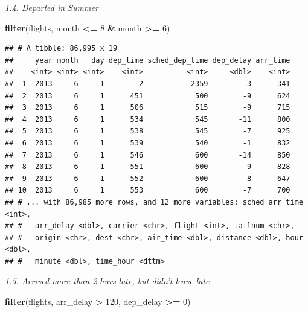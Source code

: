 \documentclass[]{book}
\newenvironment{Shaded}{\begin{snugshade}}{\end{snugshade}}
\newcommand{\DecValTok}[1]{\textcolor[rgb]{0.00,0.00,0.81}{#1}}
\newcommand{\KeywordTok}[1]{\textcolor[rgb]{0.13,0.29,0.53}{\textbf{#1}}}
\newcommand{\NormalTok}[1]{#1}
\newcommand{\OperatorTok}[1]{\textcolor[rgb]{0.81,0.36,0.00}{\textbf{#1}}}
\newcommand{\StringTok}[1]{\textcolor[rgb]{0.31,0.60,0.02}{#1}}
\theoremstyle{definition}
\theoremstyle{definition}
\theoremstyle{definition}
\theoremstyle{remark}
\begin{document}
\emph{1.4. Departed in Summer}

\begin{Shaded}
\begin{Highlighting}[]
\KeywordTok{filter}\NormalTok{(flights, month }\OperatorTok{<=}\StringTok{ }\DecValTok{8} \OperatorTok{&}\StringTok{ }\NormalTok{month }\OperatorTok{>=}\StringTok{ }\DecValTok{6}\NormalTok{)}
\end{Highlighting}
\end{Shaded}

\begin{verbatim}
## # A tibble: 86,995 x 19
##     year month   day dep_time sched_dep_time dep_delay arr_time
##    <int> <int> <int>    <int>          <int>     <dbl>    <int>
##  1  2013     6     1        2           2359         3      341
##  2  2013     6     1      451            500        -9      624
##  3  2013     6     1      506            515        -9      715
##  4  2013     6     1      534            545       -11      800
##  5  2013     6     1      538            545        -7      925
##  6  2013     6     1      539            540        -1      832
##  7  2013     6     1      546            600       -14      850
##  8  2013     6     1      551            600        -9      828
##  9  2013     6     1      552            600        -8      647
## 10  2013     6     1      553            600        -7      700
## # ... with 86,985 more rows, and 12 more variables: sched_arr_time <int>,
## #   arr_delay <dbl>, carrier <chr>, flight <int>, tailnum <chr>,
## #   origin <chr>, dest <chr>, air_time <dbl>, distance <dbl>, hour <dbl>,
## #   minute <dbl>, time_hour <dttm>
\end{verbatim}

\emph{1.5. Arrived more than 2 hurs late, but didn't leave late}

\begin{Shaded}
\begin{Highlighting}[]
\KeywordTok{filter}\NormalTok{(flights, arr_delay }\OperatorTok{>}\StringTok{ }\DecValTok{120}\NormalTok{, dep_delay }\OperatorTok{>=}\StringTok{ }\DecValTok{0}\NormalTok{)}
\end{Highlighting}
\end{Shaded}
\end{document}
